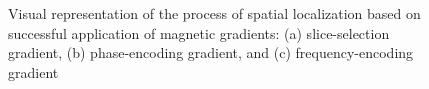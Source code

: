 \begin{figure}[ht]
\centering
{}
%
\caption{Visual representation of the process of spatial localization based on successful application of magnetic gradients: (a) slice-selection gradient, (b) phase-encoding gradient, and (c) frequency-encoding gradient~\cite{hendrick_1994}}
\label{fig:mr3}
\end{figure}

